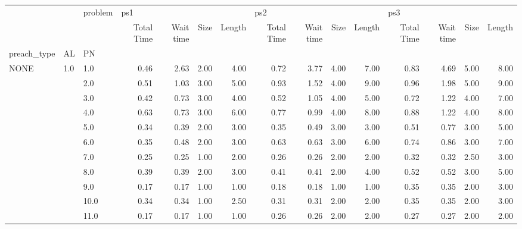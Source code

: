 \begin{tabular}{lllrrrrrrrrrrrr}
\toprule
    &     & problem & \multicolumn{4}{l}{ps1} & \multicolumn{4}{l}{ps2} & \multicolumn{4}{l}{ps3} \\
    &     & {} & Total Time & Wait time & Size & Length & Total Time & Wait time & Size & Length & Total Time & Wait time & Size & Length \\
preach\_type & AL & PN &            &           &      &        &            &           &      &        &            &           &      &        \\
\midrule
NONE & 1.0 & 1.0  &       0.46 &      2.63 & 2.00 &   4.00 &       0.72 &      3.77 & 4.00 &   7.00 &       0.83 &      4.69 & 5.00 &   8.00 \\
    &     & 2.0  &       0.51 &      1.03 & 3.00 &   5.00 &       0.93 &      1.52 & 4.00 &   9.00 &       0.96 &      1.98 & 5.00 &   9.00 \\
    &     & 3.0  &       0.42 &      0.73 & 3.00 &   4.00 &       0.52 &      1.05 & 4.00 &   5.00 &       0.72 &      1.22 & 4.00 &   7.00 \\
    &     & 4.0  &       0.63 &      0.73 & 3.00 &   6.00 &       0.77 &      0.99 & 4.00 &   8.00 &       0.88 &      1.22 & 4.00 &   8.00 \\
    &     & 5.0  &       0.34 &      0.39 & 2.00 &   3.00 &       0.35 &      0.49 & 3.00 &   3.00 &       0.51 &      0.77 & 3.00 &   5.00 \\
    &     & 6.0  &       0.35 &      0.48 & 2.00 &   3.00 &       0.63 &      0.63 & 3.00 &   6.00 &       0.74 &      0.86 & 3.00 &   7.00 \\
    &     & 7.0  &       0.25 &      0.25 & 1.00 &   2.00 &       0.26 &      0.26 & 2.00 &   2.00 &       0.32 &      0.32 & 2.50 &   3.00 \\
    &     & 8.0  &       0.39 &      0.39 & 2.00 &   3.00 &       0.41 &      0.41 & 2.00 &   4.00 &       0.52 &      0.52 & 3.00 &   5.00 \\
    &     & 9.0  &       0.17 &      0.17 & 1.00 &   1.00 &       0.18 &      0.18 & 1.00 &   1.00 &       0.35 &      0.35 & 2.00 &   3.00 \\
    &     & 10.0 &       0.34 &      0.34 & 1.00 &   2.50 &       0.31 &      0.31 & 2.00 &   2.00 &       0.35 &      0.35 & 2.00 &   3.00 \\
    &     & 11.0 &       0.17 &      0.17 & 1.00 &   1.00 &       0.26 &      0.26 & 2.00 &   2.00 &       0.27 &      0.27 & 2.00 &   2.00 \\

\end{tabular}
